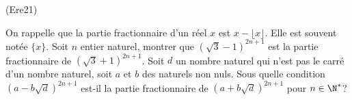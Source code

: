 \begin{tiny}(Ere21)\end{tiny} On rappelle que la partie fractionnaire d'un réel $x$ est $x -\lfloor x \rfloor$. Elle est souvent notée $\{x\}$.\newline
Soit $n$ entier naturel, montrer que $(\sqrt{3}-1)^{2n+1}$ est la partie fractionnaire de $(\sqrt{3}+1)^{2n+1}$.\newline
Soit $d$ un nombre naturel qui n'est pas le carré d'un nombre naturel, soit $a$ et $b$ des naturels non nuls. Sous quelle condition $(a-b\sqrt{d})^{2n+1}$ est-il la partie fractionnaire de $(a+b\sqrt{d})^{2n+1}$ pour $n\in \N^*$?